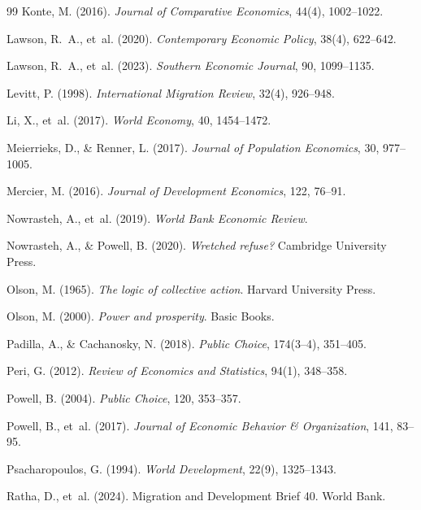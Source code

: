 \documentclass[12pt]{article}
\begin{document}
\begin{thebibliography}{99}
Konte, M. (2016). \textit{Journal of Comparative Economics}, 44(4), 1002--1022.

Lawson, R.~A., et~al. (2020). \textit{Contemporary Economic Policy}, 38(4), 622--642.

Lawson, R.~A., et~al. (2023). \textit{Southern Economic Journal}, 90, 1099--1135.

Levitt, P. (1998). \textit{International Migration Review}, 32(4), 926--948.

Li, X., et~al. (2017). \textit{World Economy}, 40, 1454--1472.

Meierrieks, D., \& Renner, L. (2017). \textit{Journal of Population Economics}, 30, 977--1005.

Mercier, M. (2016). \textit{Journal of Development Economics}, 122, 76--91.

Nowrasteh, A., et~al. (2019). \textit{World Bank Economic Review}.

Nowrasteh, A., \& Powell, B. (2020). \textit{Wretched refuse?} Cambridge University Press.

Olson, M. (1965). \textit{The logic of collective action}. Harvard University Press.

Olson, M. (2000). \textit{Power and prosperity}. Basic Books.

Padilla, A., \& Cachanosky, N. (2018). \textit{Public Choice}, 174(3--4), 351--405.

Peri, G. (2012). \textit{Review of Economics and Statistics}, 94(1), 348--358.

Powell, B. (2004). \textit{Public Choice}, 120, 353--357.

Powell, B., et~al. (2017). \textit{Journal of Economic Behavior \& Organization}, 141, 83--95.

Psacharopoulos, G. (1994). \textit{World Development}, 22(9), 1325--1343.

Ratha, D., et~al. (2024). Migration and Development Brief 40. World Bank.


\end{thebibliography}
\end{document}
